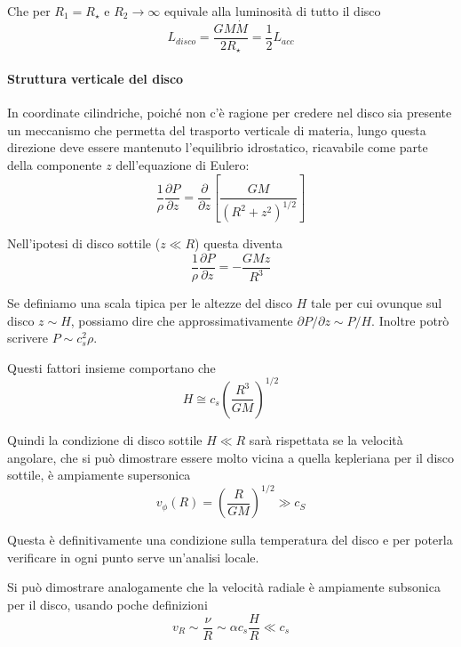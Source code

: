 \documentclass[a4paperbi]{article}
\begin{document}
	Che per $R_1=R_{\star}$ e $R_2\to\infty$ equivale alla luminosità di tutto il disco
	\begin{equation}
		L_{disco}=\frac{GM\dot{M}}{2R_{\star}}=\frac{1}{2}L_{acc}
	\end{equation}
	
	\paragraph{Struttura verticale del disco}
	In coordinate cilindriche, poiché non c'è ragione per credere nel disco sia presente un meccanismo che permetta del trasporto verticale di materia, lungo questa direzione deve essere mantenuto l'equilibrio idrostatico, ricavabile come parte della componente $z$ dell'equazione di Eulero:
	\begin{equation*}
		\frac{1}{\rho}\frac{\partial P}{\partial z}=\frac{\partial}{\partial z}\left[\frac{GM}{(R^2+z^2)^{1/2}}\right]
	\end{equation*}
	
	Nell'ipotesi di disco sottile ($z\ll R$) questa diventa
	\begin{equation}
		\frac{1}{\rho}\frac{\partial P}{\partial z}=-\frac{GMz}{R^3}
	\end{equation}
	
	Se definiamo una scala tipica per le altezze del disco $H$ tale per cui ovunque sul disco $z\sim H$, possiamo dire che approssimativamente $\partial P/\partial z\sim P/H$. Inoltre potrò scrivere $P\sim c_s^2\rho$.

	Questi fattori insieme comportano che
	\begin{equation}
		H\cong c_s\left(\frac{R^3}{GM}\right)^{1/2}
	\end{equation}

	Quindi la condizione di disco sottile $H\ll R$ sarà rispettata se la velocità angolare, che si può dimostrare essere molto vicina a quella kepleriana per il disco sottile, è ampiamente supersonica
	\begin{equation}
		v_\phi(R)=\left(\frac{R}{GM}\right)^{1/2}\gg c_S
	\end{equation}

	Questa è definitivamente una condizione sulla temperatura del disco e per poterla verificare in ogni punto serve un'analisi locale.
	
	Si può dimostrare analogamente che la velocità radiale è ampiamente subsonica per il disco, usando poche definizioni
	\begin{equation}
		v_R\sim\frac{\nu}{R}\sim\alpha c_s\frac{H}{R}\ll c_s
	\end{equation}
	
\end{document}

